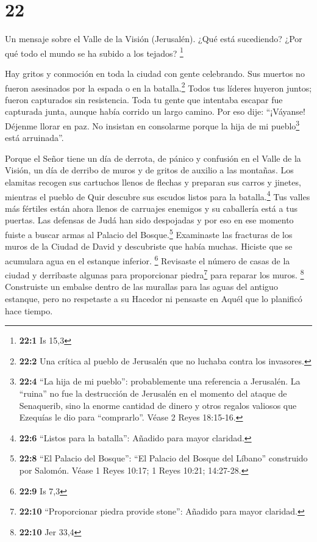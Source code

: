 \hypertarget{section-21}{%
\section{22}\label{section-21}}

 Un mensaje sobre el Valle de la Visión (Jerusalén). ¿Qué
está sucediendo? ¿Por qué todo el mundo se ha subido a los tejados?
\footnote{\textbf{22:1} Is 15,3}

 Hay gritos y conmoción en toda la ciudad con gente
celebrando. Sus muertos no fueron asesinados por la espada o en la
batalla.\footnote{\textbf{22:2} Una crítica al pueblo de Jerusalén que
  no luchaba contra los invasores.}  Todos tus líderes
huyeron juntos; fueron capturados sin resistencia. Toda tu gente que
intentaba escapar fue capturada junta, aunque había corrido un largo
camino.  Por eso dije: ``¡Váyanse! Déjenme llorar en paz.
No insistan en consolarme porque la hija de mi pueblo\footnote{\textbf{22:4}
  ``La hija de mi pueblo'': probablemente una referencia a Jerusalén. La
  ``ruina'' no fue la destrucción de Jerusalén en el momento del ataque
  de Senaquerib, sino la enorme cantidad de dinero y otros regalos
  valiosos que Ezequías le dio para ``comprarlo''. Véase 2 Reyes
  18:15-16.} está arruinada''.

 Porque el Señor tiene un día de derrota, de pánico y
confusión en el Valle de la Visión, un día de derribo de muros y de
gritos de auxilio a las montañas.  Los elamitas recogen
sus cartuchos llenos de flechas y preparan sus carros y jinetes,
mientras el pueblo de Quir descubre sus escudos listos para la
batalla.\footnote{\textbf{22:6} ``Listos para la batalla'': Añadido para
  mayor claridad.}  Tus valles más fértiles están ahora
llenos de carruajes enemigos y su caballería está a tus puertas.
 Las defensas de Judá han sido despojadas y por eso en ese
momento fuiste a buscar armas al Palacio del Bosque.\footnote{\textbf{22:8}
  ``El Palacio del Bosque'': ``El Palacio del Bosque del Líbano''
  construido por Salomón. Véase 1 Reyes 10:17; 1 Reyes 10:21; 14:27-28.}
 Examinaste las fracturas de los muros de la Ciudad de
David y descubriste que había muchas. Hiciste que se acumulara agua en
el estanque inferior. \footnote{\textbf{22:9} Is 7,3} 
Revisaste el número de casas de la ciudad y derribaste algunas para
proporcionar piedra\footnote{\textbf{22:10} ``Proporcionar piedra
  provide stone'': Añadido para mayor claridad.} para reparar los muros.
\footnote{\textbf{22:10} Jer 33,4}  Construiste un
embalse dentro de las murallas para las aguas del antiguo estanque, pero
no respetaste a su Hacedor ni pensaste en Aquél que lo planificó hace
tiempo.

